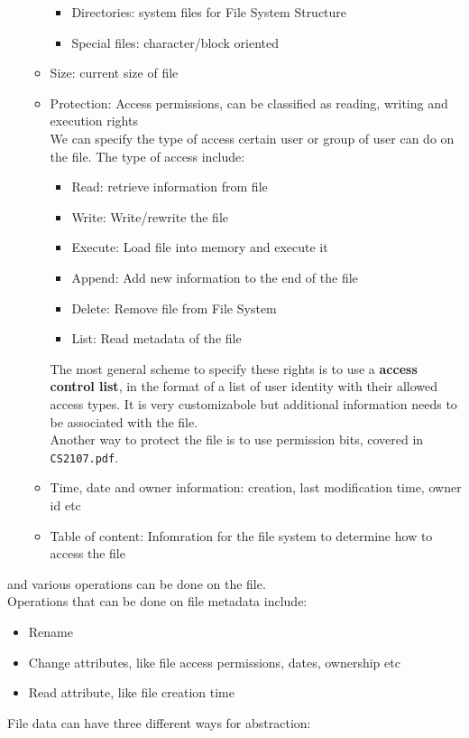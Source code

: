 \documentclass[12pt]{article}
\theoremstyle{definition}
\begin{document}
\begin{itemize}
\begin{itemize}
\begin{itemize}
      \item Directories: system files for File System Structure
      \item Special files: character/block oriented
    \end{itemize}
    \item Size: current size of file
    \item Protection: Access permissions, can be classified as reading, writing and execution rights\\
    We can specify the type of access certain user or group of user can do on the file. The type of access include:
    \begin{itemize}
      \item Read: retrieve information from file
      \item Write: Write/rewrite the file
      \item Execute: Load file into memory and execute it
      \item Append: Add new information to the end of the file
      \item Delete: Remove file from File System
      \item List: Read metadata of the file
    \end{itemize}
    The most general scheme to specify these rights is to use a \textbf{access control list}, in the format of a list of user identity with their allowed access types. It is very customizabole but additional information needs to be associated with the file.\\
    Another way to protect the file is to use permission bits, covered in \texttt{CS2107.pdf}.
    \item Time, date and owner information: creation, last modification time, owner id etc
    \item Table of content: Infomration for the file system to determine how to access the file
  \end{itemize}
\end{itemize}
and various operations can be done on the file. \\
Operations that can be done on file metadata include:
\begin{itemize}
  \item Rename
  \item Change attributes, like file access permissions, dates, ownership etc
  \item Read attribute, like file creation time
\end{itemize}
File data can have three different ways for abstraction:
\end{document}
